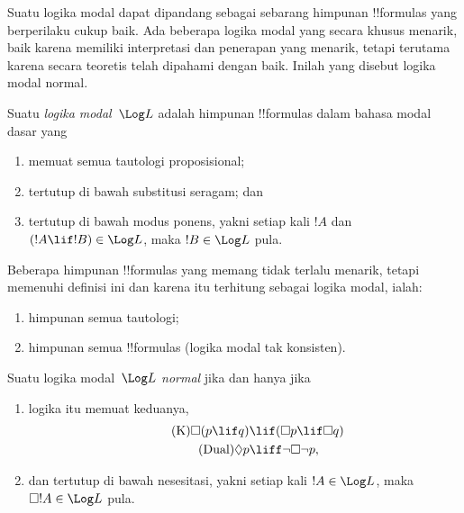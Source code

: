 \documentclass[../../../include/open-logic-section]{subfiles}
\begin{document}


Suatu logika modal dapat dipandang sebagai sebarang himpunan !!{formula}s
yang berperilaku cukup baik. Ada beberapa logika modal yang secara khusus
menarik, baik karena memiliki interpretasi dan penerapan yang menarik,
tetapi terutama karena secara teoretis telah dipahami dengan baik. Inilah
yang disebut logika modal normal.

\begin{defn}
Suatu \emph{logika modal}~$\Log L$ adalah himpunan !!{formula}s dalam
bahasa modal dasar yang
\begin{enumerate}
\item memuat semua tautologi proposisional;
\item tertutup di bawah substitusi seragam; dan
\item tertutup di bawah modus ponens, yakni setiap kali $!A$ dan $(!A \lif
  !B) \in \Log L$, maka $!B \in \Log L$ pula.
\end{enumerate}
\end{defn}

\begin{ex}
Beberapa himpunan !!{formula}s yang memang tidak terlalu menarik, tetapi
memenuhi definisi ini dan karena itu terhitung sebagai logika modal, ialah:
\begin{enumerate}
\item himpunan semua tautologi;
\item himpunan semua !!{formula}s (logika modal tak konsisten).
\end{enumerate}
\end{ex}

\begin{defn}\label{defn:normal-modal-logic}
Suatu logika modal~$\Log L$ \emph{normal} jika dan hanya jika
\begin{enumerate}
\item logika itu memuat keduanya,
\begin{align}
\tag{K} \Box(p \lif q) & \lif (\Box p \lif \Box q) \\
\tag{Dual} \Diamond p & \liff \lnot \Box \lnot p,
\end{align}
\item dan tertutup di bawah nesesitasi, yakni setiap kali $!A \in
  \Log L$, maka $\Box !A \in \Log L$ pula.
\end{enumerate}
\end{defn}
\end{document}
